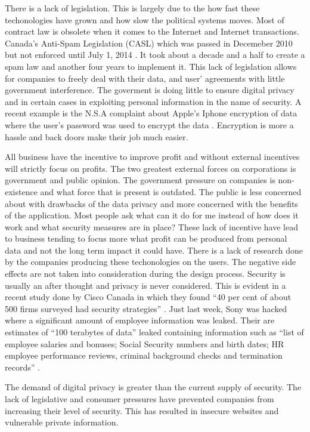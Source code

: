 \documentclass[12pt]{article}
\begin{document}
There is a lack of legislation. This is largely due to the how fast these techonologies have grown and how slow the political systems moves. Most of contract law is obsolete when it comes to the Internet and Internet transactions. Canada's Anti-Spam Legislation (CASL) which was passed in Decemeber 2010 but not enforced until July 1, 2014 \cite{FastFacts}. It took about a decade and a half to create a spam law and another four years to implement it. This lack of legislation allows for companies to freely deal with their data, and user' agreements with little government interference. The goverment is doing little to ensure digital privacy and in certain cases in exploiting personal information in the name of security. A recent example is the N.S.A complaint about Apple's Iphone encryption of data where the user's password was used to encrypt the data \cite{Schneier}. Encryption is more a hassle and back doors make their job much easier.

All business have the incentive to improve profit and without external incentives will strictly focus on profits. The two greatest external forces on corporations is government and public opinion. The government pressure on companies is non-existence and what force that is present is outdated. The public is less concerned about with drawbacks of the data privacy and more concerned with the benefits of the application. Most people ask what can it do for me instead of how does it work and what security measures are in place? These lack of incentive have lead to business tending to focus more what profit can be produced from personal data and not the long term impact it could have. There is a lack of research done by the companies producing these techonologies on the users. The negative side effects are not taken into consideration during the design process. Security is usually an after thought and privacy is never considered. This is evident in a recent study done by Cisco Canada in which they found ``40 per cent of about 500 firms surveyed had security strategies'' \cite{Blackwell}. Just last week, Sony was hacked where a significant amount of employee information was leaked. Their are estimates of ``100 terabytes of data'' leaked containing information such as ``list of employee salaries and bonuses; Social Security numbers and birth dates; HR employee performance reviews, criminal background checks and termination records'' \cite{Zetter}.

The demand of digital privacy is greater than the current supply of security. The lack of legislative and consumer pressures have prevented companies from increasing their level of security. This has resulted in insecure websites and vulnerable private information. 
\end{document}
